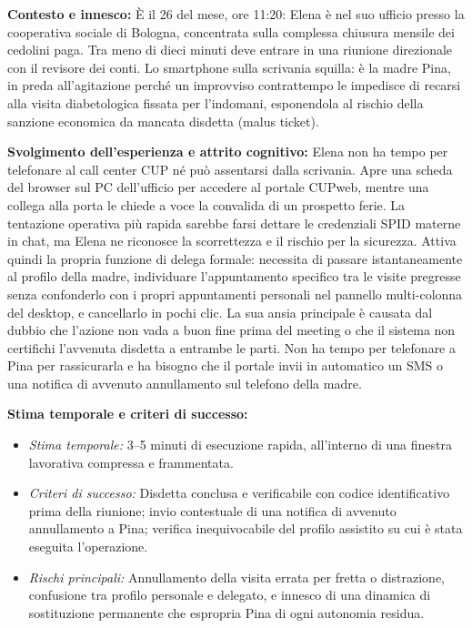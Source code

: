 \textbf{Contesto e innesco:} È il 26 del mese, ore 11:20: Elena è nel suo ufficio presso la cooperativa sociale di Bologna, concentrata sulla complessa chiusura mensile dei cedolini paga. Tra meno di dieci minuti deve entrare in una riunione direzionale con il revisore dei conti. Lo smartphone sulla scrivania squilla: è la madre Pina, in preda all'agitazione perché un improvviso contrattempo le impedisce di recarsi alla visita diabetologica fissata per l'indomani, esponendola al rischio della sanzione economica da mancata disdetta (malus ticket).
\par\vspace{2pt}
\textbf{Svolgimento dell'esperienza e attrito cognitivo:} Elena non ha tempo per telefonare al call center CUP né può assentarsi dalla scrivania. Apre una scheda del browser sul PC dell'ufficio per accedere al portale CUPweb, mentre una collega alla porta le chiede a voce la convalida di un prospetto ferie. La tentazione operativa più rapida sarebbe farsi dettare le credenziali SPID materne in chat, ma Elena ne riconosce la scorrettezza e il rischio per la sicurezza. Attiva quindi la propria funzione di delega formale: necessita di passare istantaneamente al profilo della madre, individuare l'appuntamento specifico tra le visite pregresse senza confonderlo con i propri appuntamenti personali nel pannello multi-colonna del desktop, e cancellarlo in pochi clic. La sua ansia principale è causata dal dubbio che l'azione non vada a buon fine prima del meeting o che il sistema non certifichi l'avvenuta disdetta a entrambe le parti. Non ha tempo per telefonare a Pina per rassicurarla e ha bisogno che il portale invii in automatico un SMS o una notifica di avvenuto annullamento sul telefono della madre.

\textbf{Stima temporale e criteri di successo:}
\begin{itemize}[leftmargin=*,topsep=1pt,itemsep=0pt,parsep=0pt]
\item \textit{Stima temporale:} 3--5 minuti di esecuzione rapida, all'interno di una finestra lavorativa compressa e frammentata.
\item \textit{Criteri di successo:} Disdetta conclusa e verificabile con codice identificativo prima della riunione; invio contestuale di una notifica di avvenuto annullamento a Pina; verifica inequivocabile del profilo assistito su cui è stata eseguita l'operazione.
\item \textit{Rischi principali:} Annullamento della visita errata per fretta o distrazione, confusione tra profilo personale e delegato, e innesco di una dinamica di sostituzione permanente che espropria Pina di ogni autonomia residua.
\end{itemize}

